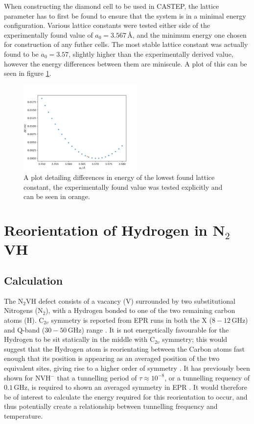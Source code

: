 \documentclass[10pt,a4paper,twocolumn,twoside]{extarticle}
\newcommand{\ntvh}{N$_2$VH}
\begin{document}
When constructing the diamond cell to be used in CASTEP, the lattice parameter has to first be found to ensure that the system is in a minimal energy configuration. Various lattice constants were tested either side of the experimentally found value of $a_0 = 3.567$\,{\AA}, and the minimum energy one chosen for construction of any futher cells. The most stable lattice constant was actually found to be $a_0 = 3.57$, slightly higher than the experimentally derived value, however the energy differences between them are miniscule. A plot of this can be seen in figure \ref{fig:conv}.

\begin{figure}
	\includegraphics[width=0.55\textwidth]{conv_2.png}
	\caption{A plot detailing differences in energy of the lowest found lattice constant, the experimentally found value was tested explicitly and can be seen in orange.}
	\label{fig:conv}
\end{figure}

\section{Reorientation of Hydrogen in N$_2$VH}
\label{n2vh}
\subsection{Calculation}
\label{n2vh_calc}
The {\ntvh} defect consists of a vacancy (V) surrounded by two substitutional Nitrogens (N$_2$), with a Hydrogen bonded to one of the two remaining carbon atoms (H). C$_{2v}$ symmetry is reported from EPR runs in both the X ($8-12$\,GHz) and Q-band ($30-50$\,GHz) range \cite{Hartland}. It is not energetically favourable for the Hydrogen to be sit statically in the middle with C$_{2v}$ symmetry; this would suggest that the Hydrogen atom is reorientating between the Carbon atoms fast enough that its position is appearing as an averaged position of the two equivalent sites, giving rise to a higher order of symmetry \cite{Shaw_QT_VH}. 
It has previously been shown for NVH$^-$ that a tunnelling period of $\tau \approx 10^{-8}$, or a tunnelling requency of $0.1$\,GHz, is required to shown an averaged symmetry in EPR \cite{Edwards_N2VH_rate}. It would therefore be of interest to calculate the energy required for this reorientation to occur, and thus potentially create a relationship between tunnelling frequency and temperature. 
\end{document}
